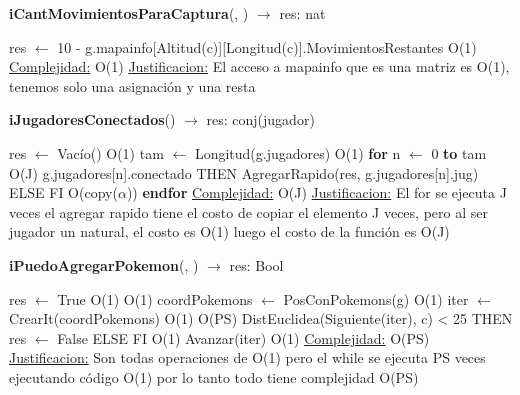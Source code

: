 \begin{Algoritmos}
\begin{algorithm}[H]{\textbf{iCantMovimientosParaCaptura}(, ) $\to$ res: nat}
	\begin{algorithmic}[1]
		\State res $\gets$ 10 - g.mapainfo[Altitud(c)][Longitud(c)].MovimientosRestantes \Comment O(1)
		\medskip
		\Statex \underline{Complejidad:} O(1)
		\Statex \underline{Justificacion:} El acceso a mapainfo que es una matriz es O(1), tenemos solo una asignaci\'on y una resta
	\end{algorithmic}
\end{algorithm}





\begin{algorithm}[H]{\textbf{iJugadoresConectados}() $\to$ res: conj(jugador)}
	\begin{algorithmic}[1]
		\State res $\gets$ Vac\'io() \Comment O(1)
		\State tam $\gets$ Longitud(g.jugadores) \Comment O(1)
		\State \textbf{for} n $\gets$ 0 \textbf{to} tam \Comment O(J)
		\State \IF g.jugadores[n].conectado THEN AgregarRapido(res, g.jugadores[n].jug) ELSE FI \Comment O(copy($\alpha$))
		\State \textbf{endfor}
		\medskip
		\Statex \underline{Complejidad:} O(J)
		\Statex \underline{Justificacion:} El for se ejecuta J veces el agregar rapido tiene el costo de copiar el elemento J veces, pero al ser jugador un natural, el costo es O(1) luego el costo de la funci\'on es O(J)
	\end{algorithmic}
\end{algorithm}


\begin{algorithm}[H]{\textbf{iPuedoAgregarPokemon}(, ) $\to$ res: Bool}
	\begin{algorithmic}[1]
		\State res $\gets$ True \Comment O(1)
		 \Comment O(1)
			\State coordPokemons $\gets$ PosConPokemons(g) \Comment O(1)
			\State iter $\gets$ CrearIt(coordPokemons) \Comment O(1)
			 \Comment O(PS)
				\State \IF DistEuclidea(Siguiente(iter), c) < 25 THEN res $\gets$ False ELSE FI \Comment O(1)
				\State Avanzar(iter) \Comment O(1)
			\EndWhile
		\Else
		\EndIf
		\medskip
		\Statex \underline{Complejidad:} O(PS)
		\Statex \underline{Justificacion:} Son todas operaciones de O(1) pero el while se ejecuta PS veces ejecutando c\'odigo O(1) por lo tanto todo tiene complejidad O(PS)
	\end{algorithmic}
\end{algorithm}


\end{Algoritmos}
